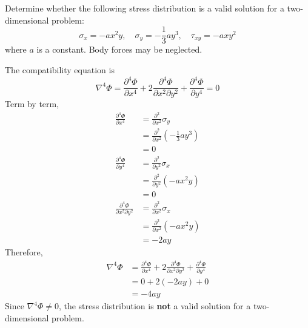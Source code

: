 \section{}
Determine whether the following stress distribution is a valid solution for a two-dimensional problem:
\begin{equation*}
    \sigma_x = -ax^2y, \quad \sigma_y = -\frac{1}{3}ay^3, \quad \tau_{xy} = -axy^2
\end{equation*}
where $a$ is a constant. Body forces may be neglected.


The compatibility equation is
\begin{equation*}
    \nabla^4 \Phi = \frac{\partial^4 \Phi}{\partial x^4} + 2 \frac{\partial^4 \Phi}{\partial x^2 \partial y^2} + \frac{\partial^4 \Phi}{\partial y^4} = 0
\end{equation*}
Term by term,
\begin{align*}
    \frac{\partial^4 \Phi}{\partial x^4} &= \frac{\partial^2}{\partial x^2} \sigma_y \\
    &= \frac{\partial^2}{\partial x^2} \left( -\frac{1}{3}ay^3 \right) \\
    &= 0 \\
    \frac{\partial^4 \Phi}{\partial y^4} &= \frac{\partial^2}{\partial y^2} \sigma_x \\
    &= \frac{\partial^2}{\partial y^2} \left( -ax^2y \right) \\
    &= 0 \\
    \frac{\partial^4 \Phi}{\partial x^2 \partial y^2} &= \frac{\partial^2}{\partial x^2} \sigma_x \\
    &= \frac{\partial^2}{\partial x^2} \left( -ax^2y \right) \\
    &= -2ay
\end{align*}
Therefore,
\begin{align*}
    \nabla^4 \Phi &= \frac{\partial^4 \Phi}{\partial x^4} + 2 \frac{\partial^4 \Phi}{\partial x^2 \partial y^2} + \frac{\partial^4 \Phi}{\partial y^4} \\
    &= 0 + 2(-2ay) + 0 \\
    &= -4ay
\end{align*}
Since $\nabla^4 \Phi \neq 0$, the stress distribution is \textbf{not} a valid solution for a two-dimensional problem.
